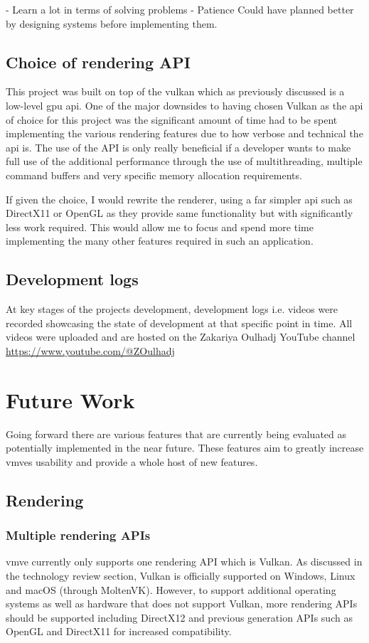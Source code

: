 \documentclass[11pt]{article}
\begin{document}
- Learn a lot in terms of solving problems
- Patience
Could have planned better by designing systems before implementing them.


\subsection{Choice of rendering API}
This project was built on top of the \gls*{vulkan} which as previously discussed is a
low-level \gls*{gpu} \gls*{api}. One of the major downsides to having chosen Vulkan as
the \gls*{api} of choice for this project was the significant amount of time had
to be spent implementing the various rendering features due to how verbose and
technical the \gls*{api} is. The use of the API is only really beneficial if a
developer wants to make full use of the additional performance through the use
of multithreading, multiple command buffers and very specific memory allocation
requirements.

If given the choice, I would rewrite the renderer, using a far simpler \gls*{api}
such as DirectX11 or OpenGL as they provide same functionality but with
significantly less work required. This would allow me to focus and spend more time 
implementing the many other features required in such an application.

\subsection{Development logs}
At key stages of the projects development, development logs i.e. videos were
recorded showcasing the state of development at that specific point in time. All
videos were uploaded and are hosted on the Zakariya Oulhadj YouTube channel
\url{https://www.youtube.com/@ZOulhadj}

\clearpage
\section{Future Work}
Going forward there are various features that are currently being evaluated as
potentially implemented in the near future. These features aim to greatly
increase \glspl*{vmve} usability and provide a whole host of new features.

\subsection{Rendering}

\subsubsection{Multiple rendering APIs}
\gls*{vmve} currently only supports one rendering API which is Vulkan. As
discussed in the technology review section, Vulkan is officially supported on
Windows, Linux and macOS (through MoltenVK). However, to support additional
operating systems as well as hardware that does not support Vulkan, more
rendering APIs should be supported including DirectX12 and previous generation
APIs such as OpenGL and DirectX11 for increased compatibility.
\end{document}
